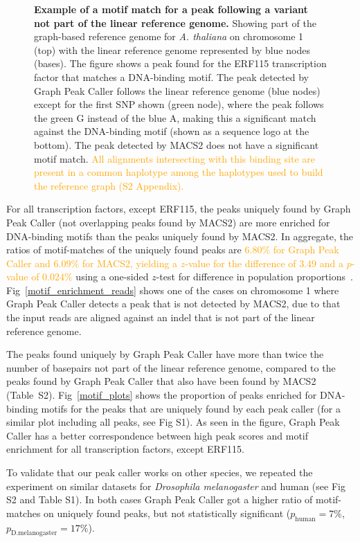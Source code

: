 \documentclass[10pt,letterpaper]{article}
\newcommand{\revision}[1]{\textcolor{orange}{#1}}
\begin{document}
\begin{figure} %
 \caption{{\bf Example of a motif match for a peak following a variant not part of the linear reference genome.} Showing part of the graph-based reference genome for \emph{A. thaliana} on chromosome 1 (top) with the linear reference genome represented by blue nodes (bases). The figure shows a peak found for the ERF115 transcription
factor that matches a DNA-binding motif. The peak detected by Graph Peak Caller follows the linear reference genome (blue nodes) except for the first SNP shown (green node), where the peak follows the green G instead of the blue A, making this a significant match against the DNA-binding motif (shown as a sequence logo at the bottom). The peak detected by MACS2 does not have a significant motif match. \revision{All alignments intersecting with this binding site are present in a common haplotype among the haplotypes used to build the reference graph (S2 Appendix).}}
\label{motif_enrichment}
\end{figure}


For all transcription factors, except ERF115, the peaks uniquely found by Graph Peak Caller (not overlapping peaks found by MACS2) are more enriched for DNA-binding motifs than the peaks uniquely found by MACS2. In aggregate, the ratios of motif-matches of the uniquely found peaks are \revision{$6.80\%$ for Graph Peak Caller and $6.09\%$ for MACS2, yielding a $z$-value for the difference of $3.49$ and a $p$-value of $0.024\%$} using a one-sided $z$-test for difference in population proportions~\cite{devoreberk}. Fig~\ref{motif_enrichment_reads} shows one of the cases on chromosome 1 where Graph Peak Caller detects a peak that is not detected by MACS2, due to that the input reads are aligned against an indel that is not part of the linear reference genome. 

The peaks found uniquely by Graph Peak Caller have more than twice the number of basepairs not part of the linear reference genome, compared to the peaks found by Graph Peak Caller that also have been found by MACS2 (Table~S2). Fig~\ref{motif_plots} shows the proportion of peaks enriched for DNA-binding motifs for the peaks that are uniquely found by each peak caller (for a similar plot including all peaks, see Fig S1). As seen in the figure, Graph Peak Caller has a better correspondence between high peak scores and motif enrichment for all transcription factors, except ERF115. 


To validate that our peak caller works on other species, we repeated the experiment on similar datasets for \emph{Drosophila melanogaster } and human (see Fig S2 and Table S1). In both cases Graph Peak Caller got a higher ratio of motif-matches on uniquely found peaks, but not statistically significant ($p_{\text{human}}=7\%$, $p_{\text{D.melanogaster}}=17\%$).
\end{document}
